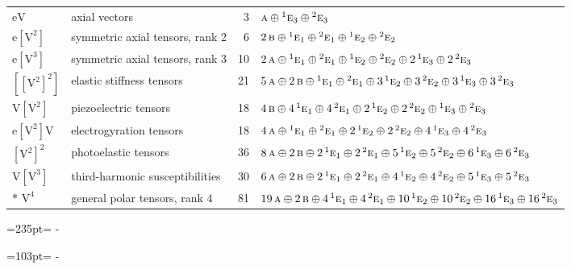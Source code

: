 \documentclass[10pt,a4paper]{article}
\newcommand{\needspace}[1]{\par\penalty-100\begingroup\dimen0=#1\relax\dimen2=\pagegoal
  \advance\dimen2-\pagetotal\ifdim\dimen0>\dimen2\relax\ifdim\dimen2>0pt\vfil\break\fi\fi
  \endgroup}
\numberwithin{equation}{section}
\newcommand{\irr}[1]{\text{\normalfont\scshape #1}}
\newcommand{\conjpair}[1]{{}^{#1}}
\newcommand{\jahn}[1]{\mathrm{#1}}
\newlength{\fillwidth}\newlength{\cellwidth}\newlength{\colwidth}
\begin{document}
{\begin{longtable}{@{}llr>{\RaggedRight\arraybackslash}p{\fillwidth}@{}}
$\jahn{eV}$ & axial vectors & 3 & $\irr{a} \oplus\allowbreak \conjpair{1}\irr{e}_{3} \oplus\allowbreak \conjpair{2}\irr{e}_{3}$\\
$\jahn{e[V^{2}]}$ & symmetric axial tensors, rank 2 & 6 & $2\,\irr{b} \oplus\allowbreak \conjpair{1}\irr{e}_{1} \oplus\allowbreak \conjpair{2}\irr{e}_{1} \oplus\allowbreak \conjpair{1}\irr{e}_{2} \oplus\allowbreak \conjpair{2}\irr{e}_{2}$\\
$\jahn{e[V^{3}]}$ & symmetric axial tensors, rank 3 & 10 & $2\,\irr{a} \oplus\allowbreak \conjpair{1}\irr{e}_{1} \oplus\allowbreak \conjpair{2}\irr{e}_{1} \oplus\allowbreak \conjpair{1}\irr{e}_{2} \oplus\allowbreak \conjpair{2}\irr{e}_{2} \oplus\allowbreak 2\,\conjpair{1}\irr{e}_{3} \oplus\allowbreak 2\,\conjpair{2}\irr{e}_{3}$\\
$\jahn{[[V^{2}]^{2}]}$ & elastic stiffness tensors & 21 & $5\,\irr{a} \oplus\allowbreak 2\,\irr{b} \oplus\allowbreak \conjpair{1}\irr{e}_{1} \oplus\allowbreak \conjpair{2}\irr{e}_{1} \oplus\allowbreak 3\,\conjpair{1}\irr{e}_{2} \oplus\allowbreak 3\,\conjpair{2}\irr{e}_{2} \oplus\allowbreak 3\,\conjpair{1}\irr{e}_{3} \oplus\allowbreak 3\,\conjpair{2}\irr{e}_{3}$\\
$\jahn{V[V^{2}]}$ & piezoelectric tensors & 18 & $4\,\irr{b} \oplus\allowbreak 4\,\conjpair{1}\irr{e}_{1} \oplus\allowbreak 4\,\conjpair{2}\irr{e}_{1} \oplus\allowbreak 2\,\conjpair{1}\irr{e}_{2} \oplus\allowbreak 2\,\conjpair{2}\irr{e}_{2} \oplus\allowbreak \conjpair{1}\irr{e}_{3} \oplus\allowbreak \conjpair{2}\irr{e}_{3}$\\
$\jahn{e[V^{2}]V}$ & electrogyration tensors & 18 & $4\,\irr{a} \oplus\allowbreak \conjpair{1}\irr{e}_{1} \oplus\allowbreak \conjpair{2}\irr{e}_{1} \oplus\allowbreak 2\,\conjpair{1}\irr{e}_{2} \oplus\allowbreak 2\,\conjpair{2}\irr{e}_{2} \oplus\allowbreak 4\,\conjpair{1}\irr{e}_{3} \oplus\allowbreak 4\,\conjpair{2}\irr{e}_{3}$\\
$\jahn{[V^{2}]^{2}}$ & photoelastic tensors & 36 & $8\,\irr{a} \oplus\allowbreak 2\,\irr{b} \oplus\allowbreak 2\,\conjpair{1}\irr{e}_{1} \oplus\allowbreak 2\,\conjpair{2}\irr{e}_{1} \oplus\allowbreak 5\,\conjpair{1}\irr{e}_{2} \oplus\allowbreak 5\,\conjpair{2}\irr{e}_{2} \oplus\allowbreak 6\,\conjpair{1}\irr{e}_{3} \oplus\allowbreak 6\,\conjpair{2}\irr{e}_{3}$\\
$\jahn{V[V^{3}]}$ & third-harmonic susceptibilities & 30 & $6\,\irr{a} \oplus\allowbreak 2\,\irr{b} \oplus\allowbreak 2\,\conjpair{1}\irr{e}_{1} \oplus\allowbreak 2\,\conjpair{2}\irr{e}_{1} \oplus\allowbreak 4\,\conjpair{1}\irr{e}_{2} \oplus\allowbreak 4\,\conjpair{2}\irr{e}_{2} \oplus\allowbreak 5\,\conjpair{1}\irr{e}_{3} \oplus\allowbreak 5\,\conjpair{2}\irr{e}_{3}$\\*
$\jahn{V^{4}}$ & general polar tensors, rank 4 & 81 & $19\,\irr{a} \oplus\allowbreak 2\,\irr{b} \oplus\allowbreak 4\,\conjpair{1}\irr{e}_{1} \oplus\allowbreak 4\,\conjpair{2}\irr{e}_{1} \oplus\allowbreak 10\,\conjpair{1}\irr{e}_{2} \oplus\allowbreak 10\,\conjpair{2}\irr{e}_{2} \oplus\allowbreak 16\,\conjpair{1}\irr{e}_{3} \oplus\allowbreak 16\,\conjpair{2}\irr{e}_{3}$\\
\bottomrule\end{longtable}}
\needspace{235pt}
\needspace{103pt}
\end{document}
